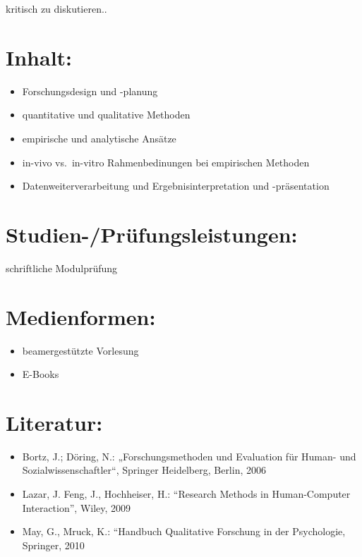kritisch zu diskutieren..

\section*{Inhalt:}\label{inhalt-3}

\begin{itemize}
\tightlist
\item
  Forschungsdesign und -planung
\item
  quantitative und qualitative Methoden
\item
  empirische und analytische Ansätze
\item
  in-vivo vs.~in-vitro Rahmenbedinungen bei empirischen Methoden
\item
  Datenweiterverarbeitung und Ergebnisinterpretation und -präsentation
\end{itemize}

\section*{Studien-/Prüfungsleistungen:}\label{studien-pruxfcfungsleistungen-3}

schriftliche Modulprüfung

\section*{Medienformen:}\label{medienformen-3}

\begin{itemize}
\tightlist
\item
  beamergestützte Vorlesung
\item
  E-Books
\end{itemize}

\section*{Literatur:}\label{literatur-3}

\begin{itemize}
\tightlist
\item
  Bortz, J.; Döring, N.: „Forschungsmethoden und Evaluation für Human-
  und Sozialwissenschaftler``, Springer Heidelberg, Berlin, 2006
\item
  Lazar, J. Feng, J., Hochheiser, H.: ``Research Methods in
  Human-Computer Interaction'', Wiley, 2009
\item
  May, G., Mruck, K.: ``Handbuch Qualitative Forschung in der
  Psychologie, Springer, 2010
\end{itemize}

